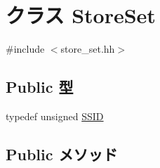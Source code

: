 \hypertarget{classStoreSet}{
\section{クラス StoreSet}
\label{classStoreSet}
}


{\ttfamily \#include $<$store\_\-set.hh$>$}\subsection*{Public 型}
\begin{DoxyCompactItemize}
\item 
typedef unsigned \hyperlink{classStoreSet_a3cffbd955ca25d7d74d98168c6ea2404}{SSID}
\end{DoxyCompactItemize}
\subsection*{Public メソッド}
